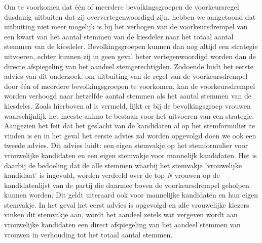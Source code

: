 Om te voorkomen dat één of meerdere bevolkingsgroepen de voorkeursregel dusdanig uitbuiten dat zij oververtegenwoordigd zijn, hebben we aangetoond dat uitbuiting niet meer mogelijk is bij het verhogen van de voorkeursdrempel van een kwart van het aantal stemmen van de kiesdeler naar het totaal aantal stemmen van de kiesdeler. Bevolkingsgroepen kunnen dan nog altijd een strategie uitvoeren, echter kunnen zij in geen geval beter vertegenwoordigd worden dan de directe afspiegeling van het aandeel stemgerechtigden. Zodoende luidt het eerste advies van dit onderzoek: om uitbuiting van de regel van de voorkeursdrempel door één of meerdere bevolkingsgroepen te voorkomen, kan de voorkeursdrempel worden verhoogd naar hetzelfde aantal stemmen als het aantal stemmen van de kiesdeler. 
Zoals hierboven al is vermeld, lijkt er bij de bevolkingsgroep vrouwen waarschijnlijk het meeste animo te bestaan voor het uitvoeren van een strategie. Aangezien het feit dat het geslacht van de kandidaten al op het stemformulier te vinden is en in het geval het eerste advies zal worden opgevolgd doen we ook een tweede advies. Dit advies luidt: een eigen stemvakje op het stemformulier voor vrouwelijke kandidaten en een eigen stemvakje voor mannelijk kandidaten. Het is daarbij de bedoeling dat de alle stemmen waarbij het stemvakje 'vrouwelijke kandidaat' is ingevuld, worden verdeeld over de top \textit{N} vrouwen op de kandidatenlijst van de partij die daarmee boven de voorkeursdrempel geholpen kunnen worden. Dit geldt uiteraard ook voor mannelijke kandidaten en hun eigen stemvakje. In het geval het eerst advies is opgevolgd en alle vrouwelijke kiezers vinken dit stemvakje aan, wordt het aandeel zetels wat vergeven wordt aan vrouwelijke kandidaten een direct afspiegeling van het aandeel stemmen van vrouwen in verhouding tot het totaal aantal stemmen.


